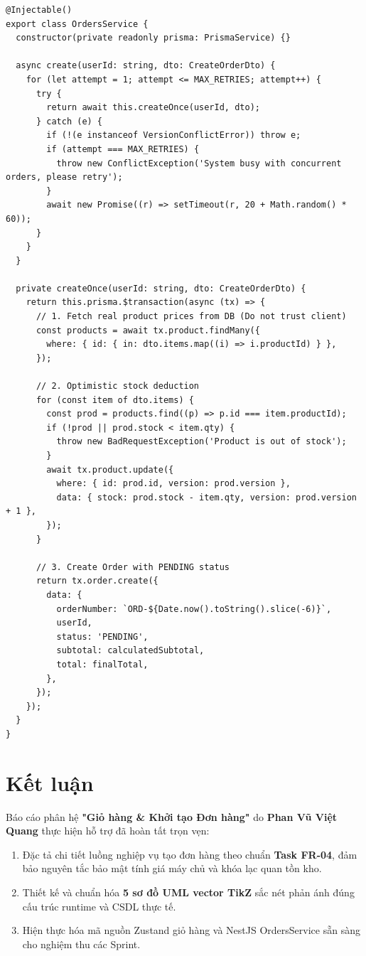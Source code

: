 \documentclass[a4paper]{article}
\begin{document}
\begin{lstlisting}[caption={Atomic Order Creation with Optimistic Locking}]
@Injectable()
export class OrdersService {
  constructor(private readonly prisma: PrismaService) {}

  async create(userId: string, dto: CreateOrderDto) {
    for (let attempt = 1; attempt <= MAX_RETRIES; attempt++) {
      try {
        return await this.createOnce(userId, dto);
      } catch (e) {
        if (!(e instanceof VersionConflictError)) throw e;
        if (attempt === MAX_RETRIES) {
          throw new ConflictException('System busy with concurrent orders, please retry');
        }
        await new Promise((r) => setTimeout(r, 20 + Math.random() * 60));
      }
    }
  }

  private createOnce(userId: string, dto: CreateOrderDto) {
    return this.prisma.$transaction(async (tx) => {
      // 1. Fetch real product prices from DB (Do not trust client)
      const products = await tx.product.findMany({
        where: { id: { in: dto.items.map((i) => i.productId) } },
      });
      
      // 2. Optimistic stock deduction
      for (const item of dto.items) {
        const prod = products.find((p) => p.id === item.productId);
        if (!prod || prod.stock < item.qty) {
          throw new BadRequestException('Product is out of stock');
        }
        await tx.product.update({
          where: { id: prod.id, version: prod.version },
          data: { stock: prod.stock - item.qty, version: prod.version + 1 },
        });
      }

      // 3. Create Order with PENDING status
      return tx.order.create({
        data: {
          orderNumber: `ORD-${Date.now().toString().slice(-6)}`,
          userId,
          status: 'PENDING',
          subtotal: calculatedSubtotal,
          total: finalTotal,
        },
      });
    });
  }
}
\end{lstlisting}

\section{Kết luận}
Báo cáo phân hệ \textbf{"Giỏ hàng \& Khởi tạo Đơn hàng"} do \textbf{Phan Vũ Việt Quang} thực hiện hỗ trợ đã hoàn tất trọn vẹn:
\begin{enumerate}
    \item Đặc tả chi tiết luồng nghiệp vụ tạo đơn hàng theo chuẩn \textbf{Task FR-04}, đảm bảo nguyên tắc bảo mật tính giá máy chủ và khóa lạc quan tồn kho.
    \item Thiết kế và chuẩn hóa \textbf{5 sơ đồ UML vector TikZ} sắc nét phản ánh đúng cấu trúc runtime và CSDL thực tế.
    \item Hiện thực hóa mã nguồn Zustand giỏ hàng và NestJS OrdersService sẵn sàng cho nghiệm thu các Sprint.
\end{enumerate}
\end{document}

